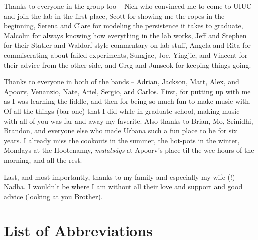 \documentclass[edeposit,fullpage,draftthesis]{uiucthesis2009}
\begin{document}
Thanks to everyone in the group too -- Nick who convinced me to come to UIUC and join
the lab in the first place, Scott for showing me the ropes in the beginning, Serena and Clare 
for modeling the persistence it takes to graduate, Malcolm for always knowing how
everything in the lab works, Jeff and Stephen for their Statler-and-Waldorf style commentary
on lab stuff, Angela and Rita for commiserating about failed experiments, Sungjae, Joe, Yingjie,
and Vincent for their advice from the other side, and Greg and Junseok for keeping things going.

Thanks to everyone in both of the bands -- Adrian, Jackson, Matt, Alex, and Apoorv,
Venanzio, Nate, Ariel, Sergio, and Carlos. First, for putting up with me as I
was learning the fiddle, and then for being so much fun to make music with.
Of all the things (bar one) that I did while in graduate school, making music
with all of you was far and away my favorite. Also thanks to Brian, Mo, Srinidhi, Brandon,
and everyone else who made Urbana such a fun place to be for six years. I already miss the
cookouts in the summer, the hot-pots in the winter,
Mondays at the Hootenanny, \textit{mulats\'{a}gs} at Apoorv's place til the wee hours of the morning,
and all the rest.

Last, and most importantly, thanks to my family and especially my wife (!) Nadha.
I wouldn't be where I am without all their love and support and good advice (looking at you Brother).


\setcounter{tocdepth}{2}

\tableofcontents
\listoftables
\listoffigures

\chapter{List of Abbreviations}
\end{document}
